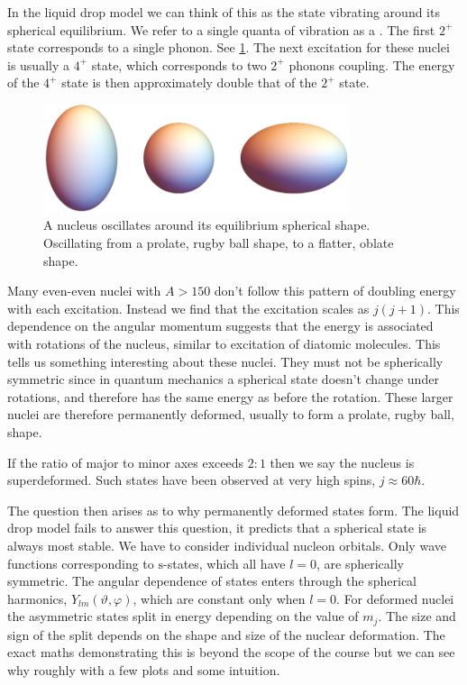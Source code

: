 \documentclass[fleqn]{NotesClass}
\begin{document}
    In the liquid drop model we can think of this as the state vibrating around its spherical equilibrium.
    We refer to a single quanta of vibration as a .
    The first \(2^+\) state corresponds to a single phonon.
    See \cref{fig:nuclear deformation}.
    The next excitation for these nuclei is usually a \(4^+\) state, which corresponds to two \(2^+\) phonons coupling.
    The energy of the \(4^+\) state is then approximately double that of the \(2^+\) state.
    
    \begin{figure}
        \includegraphics[width=0.8\textwidth]{images/nucleus-deformation.pdf}
        \caption[Nuclear deformation]{A nucleus oscillates around its equilibrium spherical shape. Oscillating from a prolate, rugby ball shape, to a flatter, oblate shape.}
        \label{fig:nuclear deformation}
    \end{figure}
    
    Many even-even nuclei with \(A > 150\) don't follow this pattern of doubling energy with each excitation.
    Instead we find that the excitation scales as \(j(j + 1)\).
    This dependence on the angular momentum suggests that the energy is associated with rotations of the nucleus, similar to excitation of diatomic molecules.
    This tells us something interesting about these nuclei.
    They must not be spherically symmetric since in quantum mechanics a spherical state doesn't change under rotations, and therefore has the same energy as before the rotation.
    These larger nuclei are therefore permanently deformed, usually to form a prolate, rugby ball, shape.
    
    If the ratio of major to minor axes exceeds \(2\colon1\) then we say the nucleus is superdeformed.
    Such states have been observed at very high spins, \(j \approx 60 \hbar\).
    
    The question then arises as to why permanently deformed states form.
    The liquid drop model fails to answer this question, it predicts that a spherical state is always most stable.
    We have to consider individual nucleon orbitals.
    Only wave functions corresponding to \(\mathrm{s}\)-states, which all have \(l = 0\), are spherically symmetric.
    The angular dependence of states enters through the spherical harmonics, \(Y_{lm}(\vartheta, \varphi)\), which are constant only when \(l = 0\).
    For deformed nuclei the asymmetric states split in energy depending on the value of \(m_j\).
    The size and sign of the split depends on the shape and size of the nuclear deformation.
    The exact maths demonstrating this is beyond the scope of the course but we can see why roughly with a few plots and some intuition.
    
\end{document}
